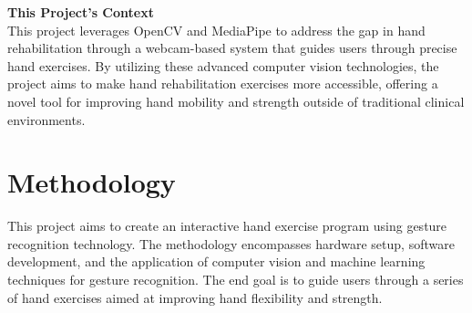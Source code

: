 \documentclass[12pt, letterpaper, twoside]{article}
\begin{document}
    \textbf{This Project's Context}
    \\This project leverages OpenCV and MediaPipe to address the gap in hand rehabilitation through a webcam-based system that guides users through precise hand exercises. By utilizing these advanced computer vision technologies, the project aims to make hand rehabilitation exercises more accessible, offering a novel tool for improving hand mobility and strength outside of traditional clinical environments.

\section{Methodology}
    This project aims to create an interactive hand exercise program using gesture recognition technology. The methodology encompasses hardware setup, software development, and the application of computer vision and machine learning techniques for gesture recognition. The end goal is to guide users through a series of hand exercises aimed at improving hand flexibility and strength.
\end{document}
